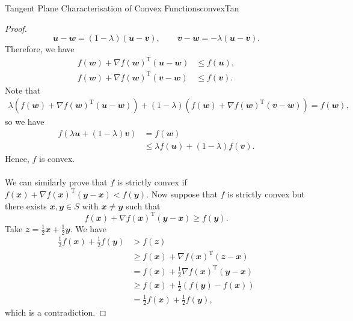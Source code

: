 \documentclass[math, code]{amznotes}
\theoremstyle{remark}
\begin{document}
\begin{probox}{Tangent Plane Characterisation of Convex Functions}{convexTan}
\begin{proof}
\begin{displaymath}
            \mathbfit{u - w} = (1 - \lambda)(\mathbfit{u - v}), \qquad \mathbfit{v - w} = -\lambda(\mathbfit{u - v}).
        \end{displaymath}
        Therefore, we have
        \begin{align*}
            f(\mathbfit{w}) + \nabla f(\mathbfit{w})^{\mathrm{T}}(\mathbfit{u - w}) & \leq f(\mathbfit{u}), \\
            f(\mathbfit{w}) + \nabla f(\mathbfit{w})^{\mathrm{T}}(\mathbfit{v - w}) & \leq f(\mathbfit{v}).
        \end{align*}
        Note that
        \begin{align*}
            \lambda\left(f(\mathbfit{w}) + \nabla f(\mathbfit{w})^{\mathrm{T}}(\mathbfit{u - w})\right) + (1 - \lambda)\left(f(\mathbfit{w}) + \nabla f(\mathbfit{w})^{\mathrm{T}}(\mathbfit{v - w})\right) = f(\mathbfit{w}),
        \end{align*}
        so we have
        \begin{align*}
            f(\lambda\mathbfit{u} + (1 - \lambda)\mathbfit{v}) & = f(\mathbfit{w}) \\
            & \leq \lambda f(\mathbfit{u}) + (1 - \lambda)f(\mathbfit{v}).
        \end{align*}
        Hence, $f$ is convex.
        \\\\
        We can similarly prove that $f$ is strictly convex if $f(\mathbfit{x}) + \nabla f(\mathbfit{x})^{\mathrm{T}}(\mathbfit{y - x}) < f(\mathbfit{y})$. Now suppose that $f$ is strictly convex but there exists $\mathbfit{x}, \mathbfit{y} \in S$ with $\mathbfit{x} \neq \mathbfit{y}$ such that
        \begin{equation*}
            f(\mathbfit{x}) + \nabla f(\mathbfit{x})^{\mathrm{T}}(\mathbfit{y - x}) \geq f(\mathbfit{y}).
        \end{equation*}
        Take $\mathbfit{z} = \frac{1}{2}\mathbfit{x} + \frac{1}{2}\mathbfit{y}$. We have
        \begin{align*}
            \frac{1}{2}f(\mathbfit{x}) + \frac{1}{2}f(\mathbfit{y}) & > f(\mathbfit{z}) \\
            & \geq f(\mathbfit{x}) + \nabla f(\mathbfit{x})^{\mathrm{T}}(\mathbfit{z - x}) \\
            & = f(\mathbfit{x}) + \frac{1}{2}\nabla f(\mathbfit{x})^{\mathrm{T}}\left(\mathbfit{y - x}\right) \\
            & \geq f(\mathbfit{x}) + \frac{1}{2}\left(f(\mathbfit{y}) - f(\mathbfit{x})\right) \\
            & = \frac{1}{2}f(\mathbfit{x}) + \frac{1}{2}f(\mathbfit{y}),
        \end{align*}
        which is a contradiction.
    \end{proof}
\end{probox}
\end{document}
